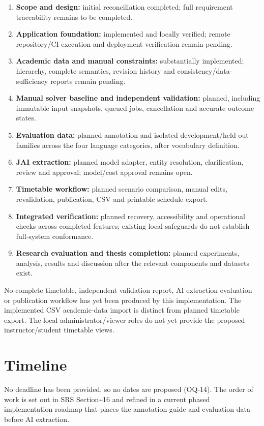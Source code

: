 \documentclass[
  11pt,a4paper,oneside]{report}
\begin{document}
\begin{enumerate}
\item \textbf{Scope and design:} initial reconciliation completed; full requirement traceability remains to be completed.
\item \textbf{Application foundation:} implemented and locally verified; remote repository/CI execution and deployment verification remain pending.
\item \textbf{Academic data and manual constraints:} substantially implemented; hierarchy, complete semantics, revision history and consistency/data-sufficiency reports remain pending.
\item \textbf{Manual solver baseline and independent validation:} planned, including immutable input snapshots, queued jobs, cancellation and accurate outcome states.
\item \textbf{Evaluation data:} planned annotation and isolated development/held-out families across the four language categories, after vocabulary definition.
\item \textbf{JAI extraction:} planned model adapter, entity resolution, clarification, review and approval; model/cost approval remains open.
\item \textbf{Timetable workflow:} planned scenario comparison, manual edits, revalidation, publication, CSV and printable schedule export.
\item \textbf{Integrated verification:} planned recovery, accessibility and operational checks across completed features; existing local safeguards do not establish full-system conformance.
\item \textbf{Research evaluation and thesis completion:} planned experiments, analysis, results and discussion after the relevant components and datasets exist.
\end{enumerate}
No complete timetable, independent validation report, AI extraction evaluation or publication workflow has yet been produced by this implementation. The implemented CSV academic-data import is distinct from planned timetable export. The local administrator/viewer roles do not yet provide the proposed instructor/student timetable views.

\hypertarget{timeline}{%
\section{Timeline}\label{timeline}}

No deadline has been provided, so no dates are proposed (OQ-14). The
order of work is set out in SRS Section\textasciitilde16 and refined in a
current phased implementation roadmap that places
the annotation guide and evaluation data before AI extraction.
\end{document}
